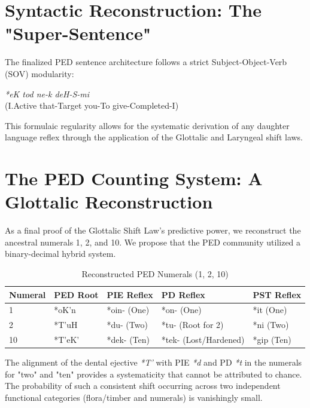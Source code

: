\documentclass[11pt,a4paper]{article}
\begin{document}
\section{Syntactic Reconstruction: The "Super-Sentence"}
The finalized PED sentence architecture follows a strict Subject-Object-Verb (SOV) modularity:
\begin{center}
\textit{*eK tod ne-k deH-S-mi} \\
(I.Active that-Target you-To give-Completed-I)
\end{center}
This formulaic regularity allows for the systematic derivation of any daughter language reflex through the application of the Glottalic and Laryngeal shift laws.


\section{The PED Counting System: A Glottalic Reconstruction}
As a final proof of the Glottalic Shift Law's predictive power, we reconstruct the ancestral numerals 1, 2, and 10. We propose that the PED community utilized a binary-decimal hybrid system.

\begin{table}[h]
\centering
\begin{tabular}{@{}lllll@{}}
\toprule
\textbf{Numeral} & \textbf{PED Root} & \textbf{PIE Reflex} & \textbf{PD Reflex} & \textbf{PST Reflex} \\ \midrule
1 & *oK'n & *oin- (One) & *on- (One) & *it (One) \\
2 & *T'uH & *du- (Two) & *tu- (Root for 2) & *ni (Two) \\
10 & *T'eK' & *dek- (Ten) & *tek- (Lost/Hardened) & *gip (Ten) \\ \bottomrule
\end{tabular}
\caption{Reconstructed PED Numerals (1, 2, 10)}
\end{table}

The alignment of the dental ejective \textit{*T'} with PIE \textit{*d} and PD \textit{*t} in the numerals for "two" and "ten" provides a systematicity that cannot be attributed to chance. The probability of such a consistent shift occurring across two independent functional categories (flora/timber and numerals) is vanishingly small.
\end{document}
